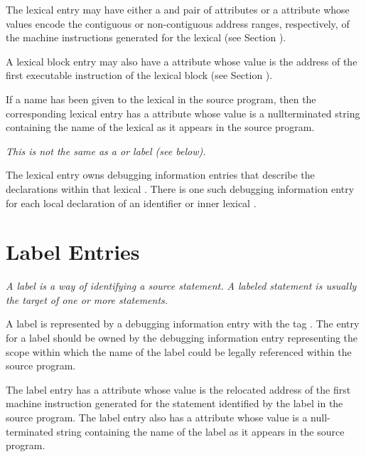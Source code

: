 The lexical  
entry may have 
either a \DWATlowpc{} and
\DWAThighpc{} pair of 
attributes 
or 
a 
\DWATranges{} attribute
whose values encode the contiguous or non-contiguous address
ranges, respectively, of the machine instructions generated
for the lexical  
(see Section ).

A 
\hypertarget{chap:DWATentrypcoflexicalblock}{}
lexical block entry may also have 
a 
\DWATentrypc{} attribute
whose value is the address of the first executable instruction
of the lexical block (see 
Section ).

If a name has been given to the 
lexical  
in the source
program, then the corresponding 
lexical  entry has a
\DWATname{} attribute whose 
value is a null\dash terminated string
containing the name of the lexical  
as it appears in
the source program.

\textit{This is not the same as a  or 
 label (see below).}

The lexical  entry owns 
debugging information entries that
describe the declarations within that lexical . 
There is
one such debugging information entry for each local declaration
of an identifier or inner lexical .

\section{Label Entries}
\label{chap:labelentries}
\textit{A label is a way of identifying a source statement. A labeled
statement is usually the target of one or more 
statements.
}

A label is represented by a debugging information entry with
the 
tag \DWTAGlabelTARG. 
The entry for a label should be owned by
the debugging information entry representing the scope within
which the name of the label could be legally referenced within
the source program.

The label entry has a \DWATlowpc{} attribute whose value
is the relocated address of the first machine instruction
generated for the statement identified by the label in
the source program.  The label entry also has a 
\DWATname{} attribute 
whose value is a null-terminated string containing
the name of the label as it appears in the source program.


